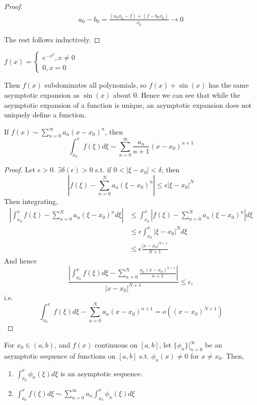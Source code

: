 \documentclass[a4paper]{article}
\begin{document}
\begin{proof}
	\begin{align*}
		a_0 - b_0 = \frac{(a_0\phi_0 - f) + (f - b_0 \phi_0)}{\phi_0} \to 0
	\end{align*}

	The rest follows inductively.
\end{proof}

\begin{eg}
	$f(x) = \begin{cases}
	 e^{-x^2}, x\neq 0 \\
	 0, x=0
	\end{cases}$

	Then $f(x)$ subdominates all polynomials, so $f(x) + \sin(x)$ has the same asymptotic expansion as $\sin(x)$ about $0$. Hence we can see that while the asymptotic expansion of a function is unique, an asymptotic expansion does not uniquely define a function. 
\end{eg}

\begin{prop}

	If $f(x) \sim \sum_{n=0}^{\infty} a_n (x-x_0)^{n}$, then
	\[
		\int_{x_0}^{x} f(\xi) d\xi \sim \sum_{n=0}^{\infty} \frac{a_n}{n+1} (x-x_0)^{n+1}
	\] 
\end{prop}

\begin{proof}
	Let $\epsilon > 0$.  $\exists \delta(\epsilon) > 0$ s.t. if $0<|\xi - x_0| < \delta$, then
	\[
		\left| f(\xi) - \sum_{n=0}^{N} a_n (\xi - x_0)^{n} \right| \le \epsilon |\xi - x_0|^{N}
	\]
	Then integrating,
	\begin{align*}
		\left|\int_{x_0}^{x} f(\xi) - \sum_{n=0}^{N} a_n (\xi - x_0)^{n} d\xi \right| &\le \int_{x_0}^{x} \left| f(\xi) - \sum_{n=0}^{N} a_n (\xi - x_0)^{n}\right| d\xi \\
		&\le  \epsilon \int_{x_0}^{x} |\xi - x_0|^{N} d\xi \\
		&\le \epsilon \frac{|x-x_0|^{N+1}}{N+1}
	\end{align*}
	And hence
	\[
		\frac{\left| \int_{x_0}^{x} f(\xi)d\xi - \sum_{n=0}^{N} \frac{a_n (x-x_0)^{n+1}}{n+1}\right|}{|x-x_0|^{N+1}} \le \epsilon
	,\]
	i.e. \[
		\int_{x_0}^{x} f(\xi) d\xi - \sum_{n=0}^{N} a_n (x-x_0)^{n+1} = o\left( (x-x_0)^{N+1} \right) 
	\] 

\end{proof}

\begin{ex}
	For $x_0 \in  (a, b)$, and $f(x)$ continuous on $[a,b]$, let $\{\phi_n\}\rvert_{n=0}^{\infty} $ be an asymptotic sequence of functions on $[a,b]$ s.t. $\phi_n(x) \neq 0$ for $x\neq x_0$. Then,
	\begin{enumerate}
		\item $\int_{x_0}^{x} \phi_n(\xi) d\xi$ is an asymptotic sequence. \\
		\item $\int_{x_0}^{x} f(\xi)d\xi \sim \sum_{n=0}^{\infty} a_n \int_{x_0}^{x} \phi_n(\xi) d\xi$
	\end{enumerate}
\end{ex}
\end{document}

